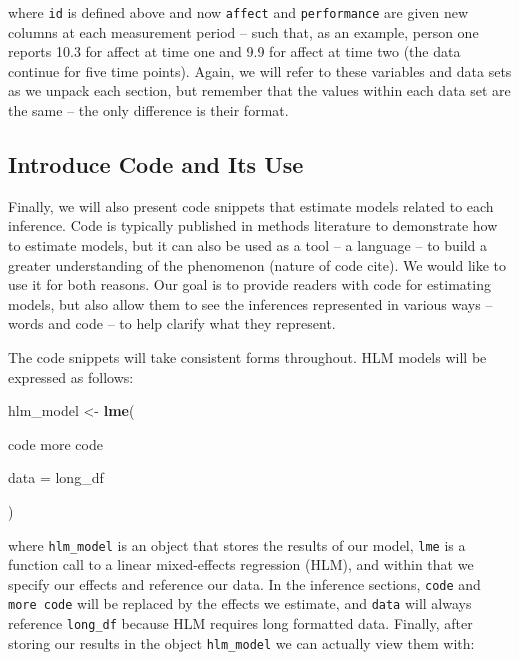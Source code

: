 \documentclass[english,,man]{apa6}
\newenvironment{Shaded}{\begin{snugshade}}{\end{snugshade}}
\newcommand{\DataTypeTok}[1]{\textcolor[rgb]{0.13,0.29,0.53}{#1}}
\newcommand{\KeywordTok}[1]{\textcolor[rgb]{0.13,0.29,0.53}{\textbf{#1}}}
\newcommand{\NormalTok}[1]{#1}
\newcommand{\StringTok}[1]{\textcolor[rgb]{0.31,0.60,0.02}{#1}}
\theoremstyle{definition}
\theoremstyle{definition}
\theoremstyle{definition}
\theoremstyle{remark}
\begin{document}
\noindent where \texttt{id} is defined above and now \texttt{affect} and
\texttt{performance} are given new columns at each measurement period --
such that, as an example, person one reports 10.3 for affect at time one
and 9.9 for affect at time two (the data continue for five time points).
Again, we will refer to these variables and data sets as we unpack each
section, but remember that the values within each data set are the same
-- the only difference is their format.

\hypertarget{introduce-code-and-its-use}{%
\subsection{Introduce Code and Its
Use}\label{introduce-code-and-its-use}}

Finally, we will also present code snippets that estimate models related
to each inference. Code is typically published in methods literature to
demonstrate how to estimate models, but it can also be used as a tool --
a language -- to build a greater understanding of the phenomenon (nature
of code cite). We would like to use it for both reasons. Our goal is to
provide readers with code for estimating models, but also allow them to
see the inferences represented in various ways -- words and code -- to
help clarify what they represent.

The code snippets will take consistent forms throughout. HLM models will
be expressed as follows:

\begin{Shaded}
\begin{Highlighting}[]
\NormalTok{hlm_model <-}\StringTok{ }\KeywordTok{lme}\NormalTok{(}
  
\NormalTok{  code}
\NormalTok{  more code}
  
  \DataTypeTok{data =}\NormalTok{ long_df}
  
\NormalTok{)}
\end{Highlighting}
\end{Shaded}

\noindent where \texttt{hlm\_model} is an object that stores the results
of our model, \texttt{lme} is a function call to a linear mixed-effects
regression (HLM), and within that we specify our effects and reference
our data. In the inference sections, \texttt{code} and
\texttt{more\ code} will be replaced by the effects we estimate, and
\texttt{data} will always reference \texttt{long\_df} because HLM
requires long formatted data. Finally, after storing our results in the
object \texttt{hlm\_model} we can actually view them with:
\end{document}
